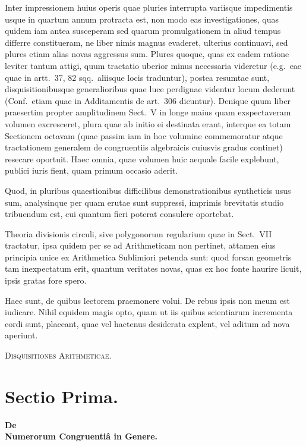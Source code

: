 \documentclass[12pt,a4paper]{article}
\theoremstyle{plain}
\theoremstyle{definition}
\theoremstyle{remark}
\begin{document}
Inter impressionem huius operis quae pluries interrupta variisque impedimentis usque in quartum annum protracta est, non modo eas investigationes, quas quidem iam antea susceperam sed quarum promulgationem in aliud tempus differre constitueram, ne liber nimis magnus evaderet, ulterius continuavi, sed plures etiam alias novas aggressus sum. Plures quoque, quas ex eadem ratione leviter tantum attigi, quum tractatio uberior minus necessaria videretur (e.g.\ eae quae in artt.~37, 82 sqq.\ aliisque locis traduntur), postea resumtae sunt, disquisitionibusque generalioribus quae luce perdignae videntur locum dederunt (Conf.\ etiam quae in Additamentis de art.~306 dicuntur). Denique quum liber praesertim propter amplitudinem Sect.~V in longe maius quam exspectaveram volumen excresceret, plura quae ab initio ei destinata erant, interque ea totam Sectionem octavam (quae passim iam in hoc volumine commemoratur atque tractationem generalem de congruentiis algebraicis cuiusvis gradus continet) resecare oportuit. Haec omnia, quae volumen huic aequale facile explebunt, publici iuris fient, quam primum occasio aderit.

Quod, in pluribus quaestionibus difficilibus demonstrationibus syntheticis usus sum, analysinque per quam erutae sunt suppressi, imprimis brevitatis studio tribuendum est, cui quantum fieri poterat consulere oportebat.

Theoria divisionis circuli, sive polygonorum regularium quae in Sect.~VII tractatur, ipsa quidem per se ad Arithmeticam non pertinet, attamen eius principia unice ex Arithmetica Sublimiori petenda sunt: quod forsan geometris tam inexpectatum erit, quantum veritates novas, quas ex hoc fonte haurire licuit, ipsis gratas fore spero.

Haec sunt, de quibus lectorem praemonere volui. De rebus ipsis non meum est iudicare. Nihil equidem magis opto, quam ut iis quibus scientiarum incrementa cordi sunt, placeant, quae vel hactenus desiderata explent, vel aditum ad nova aperiunt.
\clearpage

\begin{center}
{\LARGE\scshape Disquisitiones Arithmeticae.}
\end{center}
\vspace{1em}

\section*{Sectio Prima.}
\begin{center}
\textbf{\large De}\\[0.5em]
\textbf{\large Numerorum Congruentiâ in Genere.}
\end{center}
\end{document}
